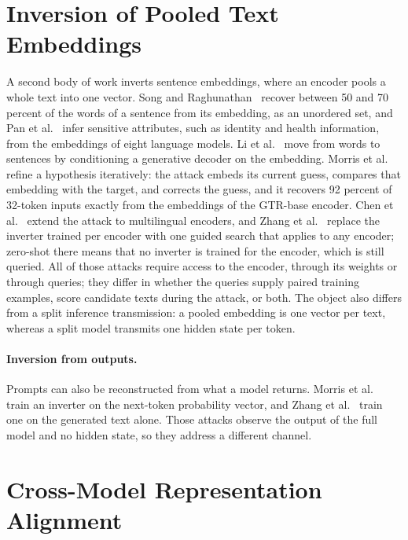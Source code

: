 \section{Inversion of Pooled Text Embeddings}\label{sec:lit:pooled}

A second body of work inverts sentence embeddings, where an encoder pools a whole text into one vector.
Song and Raghunathan~\cite{song2020information} recover between 50 and 70 percent of the words of a sentence from its embedding, as an unordered set, and Pan et al.~\cite{pan2020privacy} infer sensitive attributes, such as identity and health information, from the embeddings of eight language models.
Li et al.~\cite{li2023sentence} move from words to sentences by conditioning a generative decoder on the embedding.
Morris et al.~\cite{morris2023text} refine a hypothesis iteratively: the attack embeds its current guess, compares that embedding with the target, and corrects the guess, and it recovers 92 percent of 32-token inputs exactly from the embeddings of the GTR-base encoder.
Chen et al.~\cite{chen2024text} extend the attack to multilingual encoders, and Zhang et al.~\cite{zhang2025universal} replace the inverter trained per encoder with one guided search that applies to any encoder; zero-shot there means that no inverter is trained for the encoder, which is still queried.
All of those attacks require access to the encoder, through its weights or through queries; they differ in whether the queries supply paired training examples, score candidate texts during the attack, or both.
The object also differs from a split inference transmission: a pooled embedding is one vector per text, whereas a split model transmits one hidden state per token.

\paragraph{Inversion from outputs.} Prompts can also be reconstructed from what a model returns.
Morris et al.~\cite{morris2024language} train an inverter on the next-token probability vector, and Zhang et al.~\cite{zhang2024extracting} train one on the generated text alone.
Those attacks observe the output of the full model and no hidden state, so they address a different channel.

\section{Cross-Model Representation Alignment}\label{sec:lit:align}

